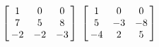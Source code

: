 {$\left[\hskip -3pt \begin{array}{ccc} 1&0&0\\  7&5&8
\\  -2&-2&-3\end{array}\hskip -3pt \right]$ 
}
{$ \left[\hskip -3pt \begin{array}{ccc} 1&0&0\\  5&-3&-8
\\  -4&2&5\end{array}\hskip -3pt \right]$}
